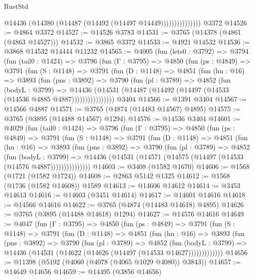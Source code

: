 \begin{lexlean}{RustStd}
\begin{coremodule}
                        @14436 (@14380 (@14487 (@14492 (@14497 @14449)))))))))))))))
    @3372
@14526 := @4864 @3372
@14527 := @14526 @3783
@14531 := @3765 (@14378 (@4861 (@4863 @14527)))
@14532 := @3865 @3372
@14533 := @4921 @14532
@14536 := @3868 @14532 @14444 @11232
@14565 := @4005
    (fun (lets0 : @3792) =>
    @3794
      (fun (tail0 : @1424) =>
      @3796
        (fun (Γ : @3795) =>
        @4850
          (fun (ps : @4849) =>
          @3791
            (fun (S : @1148) =>
            @3791
              (fun (D : @1148) =>
              @4851
                (fun (hn : @16) =>
                @3893
                  (fun (pns : @3892) =>
                  @3790
                    (fun (pl : @3789) =>
                    @4852
                      (fun (bodyL : @3799) =>
                      @14436
                        (@14531 (@14487 (@14492 (@14497 (@14533 (@14536 @4885 @4887))))))))))))))))
    @3404
@14566 := @1391 @3404
@14567 := @14566 @4887
@14571 := @3765 (@4874 (@14483 @14567) @4895)
@14575 := @3765 (@3895 (@14488 @14567) @1294)
@14576 := @14536 @3404
@14601 := @4029
    (fun (tail0 : @1424) =>
    @3796
      (fun (Γ : @3795) =>
      @4850
        (fun (ps : @4849) =>
        @3791
          (fun (S : @1148) =>
          @3791
            (fun (D : @1148) =>
            @4851
              (fun (hn : @16) =>
              @3893
                (fun (pns : @3892) =>
                @3790
                  (fun (pl : @3789) =>
                  @4852
                    (fun (bodyL : @3799) =>
                    @14436 (@14531 (@14571 (@14575 (@14497 (@14533 (@14576 @4887)))))))))))))))
@14603 := @3408 (@1582 @1670)
@14606 := @1568 (@1721 (@1582 @1724))
@14608 := @2863 @5142 @1325
@14612 := @1568 (@1736 (@1582 @14608)) @1589
@14613 := @14606 @14612
@14614 := @3453 @14613
@14616 := @14603 (@3451 @14614)
@14617 := @14601 @14616
@14618 := @14566 @14616
@14622 := @3765 (@4874 (@14483 @14618) @4895)
@14626 := @3765 (@3895 (@14488 @14618) @1294)
@14627 := @14576 @14616
@14649 := @4047
    (fun (Γ : @3795) =>
    @4850
      (fun (ps : @4849) =>
      @3791
        (fun (S : @1148) =>
        @3791
          (fun (D : @1148) =>
          @4851
            (fun (hn : @16) =>
            @3893
              (fun (pns : @3892) =>
              @3790
                (fun (pl : @3789) =>
                @4852
                  (fun (bodyL : @3799) =>
                  @14436 (@14531 (@14622 (@14626 (@14497 (@14533 @14627)))))))))))))
@14656 := @11398 (@5192 (@4060 (@4078 (@4065 @1029 @4080)) @3843))
@14657 := @14649 @14656
@14659 := @14495 (@3856 @14656)

\end{coremodule}
\end{lexlean}
